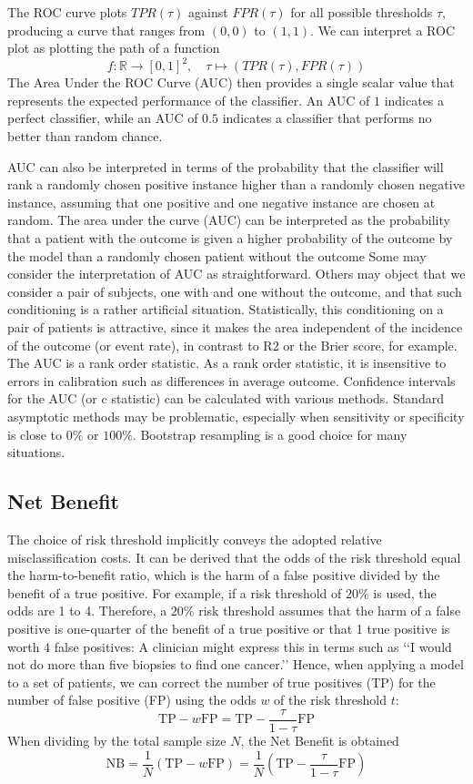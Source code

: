     	
	The ROC curve plots $TPR(\tau)$ against $FPR(\tau)$ for all possible thresholds $\tau$, producing a curve that ranges from $(0,0)$ to $(1,1)$.
	We can interpret a ROC plot as plotting the path of a function
	\[
		f: \mathbb{R} \to [0,1]^2, \quad  \tau \mapsto (TPR(\tau), FPR(\tau))
	\]
	The Area Under the ROC Curve (AUC) then provides a single scalar value that represents the expected performance of the classifier.
	An AUC of $1$ indicates a perfect classifier, while an AUC of $0.5$ indicates a classifier that performs no better than random chance.
	
	AUC can also be interpreted in terms of the probability that the classifier will rank a randomly chosen positive instance higher than a randomly chosen negative instance,
	assuming that one positive and one negative instance are chosen at random.
	The area under the curve (AUC) can be interpreted as the probability that a patient with the outcome is given a higher probability of the outcome by the model
	than a randomly chosen patient without the outcome
	Some may consider the interpretation of AUC as straightforward. Others may object that we consider a pair of subjects, one with and one without the outcome, 
	and that such conditioning is a rather artificial situation. 
	Statistically, this conditioning on a pair of patients is attractive, since it makes the area independent of the incidence of the outcome (or event rate), 
	in contrast to R2 or the Brier score, for example.
	The AUC is a rank order statistic.
	As a rank order statistic, it is insensitive to errors in calibration such as differences in average outcome.
	Confidence intervals for the AUC (or c statistic) can be calculated with various methods. 
	Standard asymptotic methods may be problematic, especially when sensitivity or specificity is close to $0\%$ or $100\%$. 
	Bootstrap resampling is a good choice for many situations.
	
	
	
\subsection{Net Benefit}
	The choice of risk threshold implicitly conveys the adopted relative misclassification costs. 
	It can be derived that the odds of the risk threshold equal the harm-to-benefit ratio, which is the harm of a false positive divided by the benefit of a true positive.
	For example, if a risk threshold of $20\%$ is used, the odds are 1 to 4. 
	Therefore, a $20\%$ risk threshold assumes that the harm of a false positive is one-quarter of the benefit of a true positive or that 1 true positive is worth 4 false positives: 
	A clinician might express this in terms such as ‘‘I would not do more than five biopsies to find one cancer.’’ 
	Hence, when applying a model to a set of patients,
	we can correct the number of true positives (TP) for the number of false positive (FP) using the odds $w$ of the risk threshold $t$: 
	\[
		\text{TP} - w \text{FP} = \text{TP} - \frac{\tau}{1-\tau} \text{FP}
	\]
	When dividing by the total sample size $N$, the Net Benefit is obtained
	\[
		\text{NB} = \frac{1}{N} (\text{TP} - w \text{FP}) = \frac{1}{N} (\text{TP} - \frac{\tau}{1-\tau} \text{FP})
	\]
	
